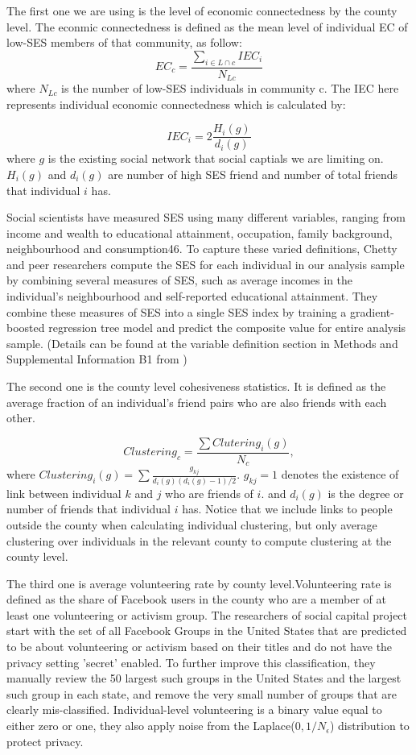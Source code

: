 \documentclass{article}
\begin{document}
The first one we are using is the level of economic connectedness by the county level. The econmic connectedness is defined as the mean level of individual EC of low-SES members of that community, as follow: $$EC_c=\frac{\sum_{i\in L \cap c}{IEC_i}}{N_{Lc}}$$ where $N_{Lc}$ is the number of low-SES individuals in community c. The IEC here represents individual economic connectedness which is calculated by:

$$IEC_i=2\frac{H_i(g)}{d_i(g)}$$ where $g$ is the existing social network that social captials we are limiting on. $H_i(g)$ and $d_i(g)$ are number of high SES friend and number of total friends that individual $i$ has.


Social scientists have measured SES using many different variables, ranging from income and wealth to educational attainment, occupation, family background, neighbourhood and consumption46. To capture these varied definitions, Chetty and peer researchers compute the SES for each individual in our analysis sample by combining several measures of SES, such as average incomes in the individual’s neighbourhood and self-reported educational attainment. They combine these measures of SES into a single SES index by training a gradient-boosted regression tree model and predict the composite value for entire analysis sample. (Details can be found at the variable definition section in Methods and Supplemental Information B1 from \cite{chetty2022social1})

The second one is the county level cohesiveness statistics. It is defined as the average fraction of an individual's friend pairs who are also friends with each other.

$$Clustering_c=\frac{\sum{Clutering_i(g)}}{N_c},$$
where $Clustering_i(g)=\sum{\frac{g_{kj}}{d_i(g)(d_i(g)-1)/2}}$. $g_{kj}=1$ denotes the existence of link between individual $k$ and $j$ who are friends of $i$. and $d_i(g)$ is the degree or number of friends that individual $i$ has. Notice that we include links to people outside the county when calculating individual clustering, but only average clustering
over individuals in the relevant county to compute clustering at the
county level.


The third one is average volunteering rate by county level.Volunteering rate is defined as the share of Facebook users in the county who are a member of at least one volunteering or activism group. The researchers of social capital project start with the set of all Facebook Groups in the United States that are predicted to be about volunteering or activism based on their titles and do not have the privacy setting 'secret' enabled. To further improve this classification, they manually review the 50 largest such groups in the United States and the largest such group in each state, and remove the very small number of groups that are clearly mis-classified. Individual-level volunteering is a binary value equal to either zero or one, they also apply noise from the Laplace($0, 1/N_\epsilon$) distribution to protect privacy.
\end{document}
